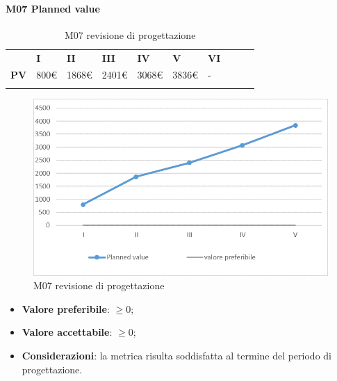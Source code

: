 \paragraph{M07 Planned value} \mbox{}
\begin{longtable}[H!] {						
		>{}p{38mm}  		
		>{}p{12mm}
		>{}p{12mm}		
		>{}p{12mm}		
		>{}p{12mm}		
		>{}p{12mm}		
		>{}p{12mm}
		>{}p{12mm}
		>{}p{12mm}
		>{}p{12mm}
	}
	\rowcolor{gray!50}
	\textbf{} & \textbf{I} & \textbf{II} & \textbf{III} & \textbf{IV} & \textbf{V} & \textbf{VI} \TBstrut \\ [2mm]
	\textbf{PV} & 800\euro & 1868\euro & 2401\euro & 3068\euro & 3836\euro & - \TBstrut \\ [2mm]
	\rowcolor{white}
	\caption{M07 revisione di progettazione}
\end{longtable}
\begin{figure}[H] 	
\includegraphics[width=\linewidth]{./img/grafici/RP4.png}	
\caption{M07 revisione di progettazione}	
\end{figure}
\begin{itemize}
	\item \textbf{Valore preferibile}: $\ge0$;
	\item \textbf{Valore accettabile}: $\ge0$;
	\item \textbf{Considerazioni}: la metrica risulta soddisfatta al termine del periodo di progettazione.
\end{itemize}
